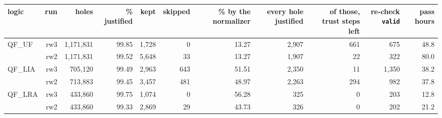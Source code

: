 \begin{tabular}{lrrrrrrrrrr}
\toprule
logic & run & holes & \% justified & kept & skipped & \% by the normalizer & every hole justified & of those, trust steps left & re-check \texttt{valid} & pass hours \\
\midrule
QF\_UF & rw3 & 1,171,831 & 99.85 & 1,728 & 0 & 13.27 & 2,907 & 661 & 675 & 48.8 \\
 & rw2 & 1,171,831 & 99.52 & 5,648 & 33 & 13.27 & 1,907 & 22 & 322 & 80.0 \\
\midrule
QF\_LIA & rw3 & 705,120 & 99.49 & 2,963 & 643 & 51.51 & 2,350 & 11 & 1,350 & 38.2 \\
 & rw2 & 713,883 & 99.45 & 3,457 & 481 & 48.97 & 2,263 & 294 & 982 & 37.8 \\
\midrule
QF\_LRA & rw3 & 433,860 & 99.75 & 1,074 & 0 & 56.28 & 325 & 0 & 203 & 12.8 \\
 & rw2 & 433,860 & 99.33 & 2,869 & 29 & 43.73 & 326 & 0 & 202 & 21.2 \\
\bottomrule
\end{tabular}
